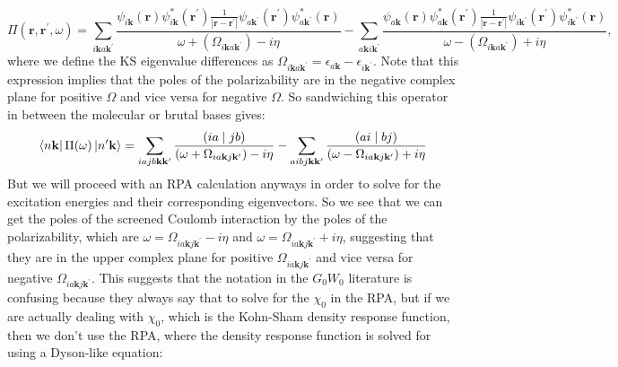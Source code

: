 \documentclass[12pt]{article}
\begin{document}
    \begin{equation}
    \Pi\left(\mathbf{r}, \mathbf{r}^{\prime}, \omega\right)=\sum_{i\mathbf{k}a\mathbf{k}^{\prime}}\frac{\psi_{i\mathbf{k} }(\mathbf{r}) \psi_{i\mathbf{k}}^{*}\left(\mathbf{r}^{\prime}\right)\frac{1}{|\mathbf{r}-\mathbf{r}^\prime|} \psi_{a\mathbf{k}^{\prime}}\left(\mathbf{r}^{\prime}\right) \psi_{a\mathbf{k}^{\prime}}^{*}(\mathbf{r})}{\omega+\left(\Omega_{i\mathbf{k}a\mathbf{k}^{\prime}}\right)-i\eta } - \sum_{a\mathbf{k}i\mathbf{k}^{\prime}}\frac{\psi_{a\mathbf{k}}(\mathbf{r}) \psi_{a\mathbf{k}}^{*}\left(\mathbf{r}^{\prime}\right) \frac{1}{|\mathbf{r}-\mathbf{r}^\prime|}\psi_{i\mathbf{k}^{\prime}}\left(\mathbf{r}^{\prime}\right) \psi_{i\mathbf{k}^{\prime}}^{*}(\mathbf{r})}{\omega-\left(\Omega_{i\mathbf{k}a\mathbf{k}^{\prime}}\right)+i\eta },
    \end{equation}
    where we define the KS eigenvalue differences as \(\Omega_{i\mathbf{k}a\mathbf{k}^{\prime}} = \epsilon_{a\mathbf{k}} - \epsilon_{i\mathbf{k}^{\prime}}\). Note that this expression implies that the poles of the polarizability are in the negative complex plane for positive $\Omega $ and vice versa for negative $\Omega $. So sandwiching this operator in between the molecular or brutal bases gives:
    \begin{equation}
        \bra{n\mathbf{k}} \Pi (\omega) \ket{n^\prime\mathbf{k}} = \sum_{iajb \mathbf{k} \mathbf{k}^{\prime}} \frac{(ia\mid jb)}{(\omega + \Omega_{ia\mathbf{k}j\mathbf{k}^{\prime}})-i\eta} - \sum_{aibj \mathbf{k} \mathbf{k}^{\prime}} \frac{(ai\mid bj)}{(\omega - \Omega_{ia\mathbf{k}j\mathbf{k}^{\prime}})+i\eta}
    \end{equation}
    But we will proceed with an RPA calculation anyways in order to solve for the excitation energies and their corresponding eigenvectors. So we see that we can get the poles of the screened Coulomb interaction by the poles of the polarizability, which are $\omega = \Omega_{ia\mathbf{k}j\mathbf{k}^{\prime}} - i\eta$ and $\omega = \Omega_{ia\mathbf{k}j\mathbf{k}^{\prime}} + i\eta$, suggesting that they are in the upper complex plane for positive $\Omega_{ia\mathbf{k}j\mathbf{k}^{\prime}}$ and vice versa for negative $\Omega_{ia\mathbf{k}j\mathbf{k}^{\prime}}$. This suggests that the notation in the $G_0W_0$ literature is confusing because they always say that to solve for the $\chi_0$ in the RPA, but if we are actually dealing with $\chi_0$, which is the Kohn-Sham density response function, then we don't use the RPA, where the density response function is solved for using a Dyson-like equation:
\end{document}
